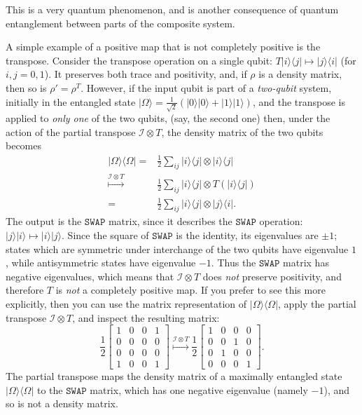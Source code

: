 \documentclass[fleqn]{article}
\begin{document}
This is a very quantum phenomenon, and is another consequence of quantum entanglement between parts of the composite system.

A simple example of a positive map that is not completely positive is the transpose.
Consider the transpose operation on a single qubit: \(T|i\rangle\langle j|\mapsto|j\rangle\langle i|\) (for \(i,j=0,1\)).
It preserves both trace and positivity, and, if \(\rho\) is a density matrix, then so is \(\rho'=\rho^T\).
However, if the input qubit is part of a \emph{two-qubit} system, initially in the entangled state \(|\Omega\rangle=\frac{1}{\sqrt{2}}(|0\rangle|0\rangle+|1\rangle|1\rangle)\), and the transpose is applied to \emph{only one} of the two qubits, (say, the second one) then, under the action of the partial transpose \(\mathcal{I}\otimes T\), the density matrix of the two qubits becomes
\[
  \begin{aligned}
    |\Omega\rangle\langle\Omega|
    =& \frac12\sum_{ij} |i\rangle\langle j| \otimes|i\rangle\langle j|
  \\\overset{\mathcal{I}\otimes T}{\longmapsto}& \frac12\sum_{ij} |i\rangle\langle j| \otimes T(|i\rangle\langle j|)
  \\=& \frac12\sum_{ij} |i\rangle\langle j| \otimes|j\rangle\langle i|.
  \end{aligned}
\]
The output is the \(\texttt{SWAP}\) matrix, since it describes the \(\texttt{SWAP}\) operation: \(|j\rangle|i\rangle\mapsto|i\rangle|j\rangle\).
Since the square of \(\texttt{SWAP}\) is the identity, its eigenvalues are \(\pm1\); states which are symmetric under interchange of the two qubits have eigenvalue \(1\), while antisymmetric states have eigenvalue \(-1\).
Thus the \(\texttt{SWAP}\) matrix has negative eigenvalues, which means that \(\mathcal{I}\otimes T\) does \emph{not} preserve positivity, and therefore \(T\) is \emph{not} a completely positive map.
If you prefer to see this more explicitly, then you can use the matrix representation of \(|\Omega\rangle\langle\Omega|\), apply the partial transpose \(\mathcal{I}\otimes T\), and inspect the resulting matrix:
\[
  \frac12\left[
  \begin{array}{cc|cc}
    1 & 0 & 0 & 1
  \\0 & 0 & 0 & 0\\
  \hline
  0 & 0 & 0 & 0
  \\1 & 0 & 0 & 1
  \end{array}\right]
  \overset{\mathcal{I}\otimes T}{\longmapsto}
  \frac12\left[
  \begin{array}{cc|cc}
    1 & 0 & 0 & 0
  \\0 & 0 & 1 & 0\\
  \hline
 0 & 1 & 0 & 0
  \\0 & 0 & 0 & 1
  \end{array}\right].
\]
The partial transpose maps the density matrix of a maximally entangled state \(|\Omega\rangle\langle\Omega|\) to the \(\texttt{SWAP}\) matrix, which has one negative eigenvalue (namely \(-1\)), and so is not a density matrix.
\end{document}
